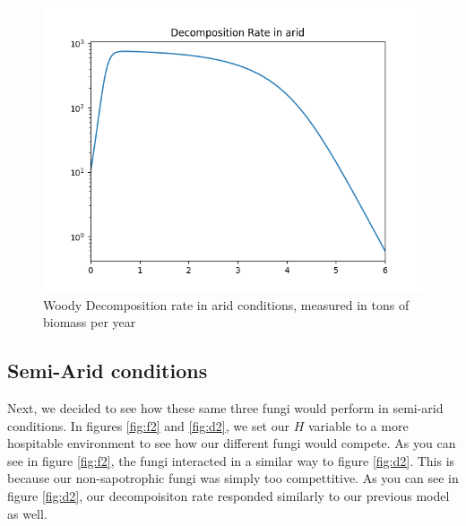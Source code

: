 \documentclass[twocolumn]{article} %
\begin{document}
\begin{figure}[bt]
	\includegraphics[width=\columnwidth]{figures/Figure_2.png}
      \caption{Woody Decomposition rate in arid conditions, measured in tons of biomass per year}
      \label{fig:d1}
\end{figure}

\subsection{Semi-Arid conditions}
\noindent Next, we decided to see how these same three fungi would perform in semi-arid conditions. In figures \ref{fig:f2} and \ref{fig:d2}, we set our $ H $ variable to a more hospitable environment to see how our different fungi would compete. As you can see in figure \ref{fig:f2}, the fungi interacted in a similar way to figure \ref{fig:d2}. This is because our non-sapotrophic fungi was simply too compettitive. As you can see in figure \ref{fig:d2}, our decompoisiton rate responded similarly to our previous model as well. 
\end{document}
